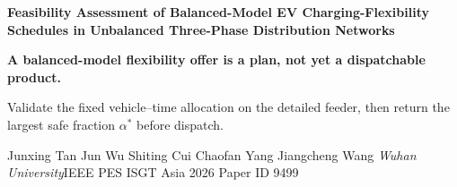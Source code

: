 \documentclass[final]{beamer}
\begin{document}
\begin{frame}[t]

\begin{tcolorbox}[enhanced,colback=posterNavy,colframe=posterNavy,boxrule=0pt,
  arc=0pt,left=0.72cm,right=0.72cm,top=0.38cm,bottom=0.38cm]
  {\color{white}\fontsize{70}{78}\selectfont\bfseries
  Feasibility Assessment of Balanced-Model EV Charging-Flexibility\\[-0.02em]
  Schedules in Unbalanced Three-Phase Distribution Networks\par}
  \vspace{0.16cm}
  {\color{posterAmber}\fontsize{37}{44}\selectfont\bfseries
  A balanced-model flexibility offer is a plan, not yet a dispatchable product.\par}
  \vspace{0.10cm}
  {\color{white}\fontsize{31}{37}\selectfont
  Validate the fixed vehicle--time allocation on the detailed feeder, then return the largest safe fraction $\alpha^*$ before dispatch.\par}
  \vspace{0.16cm}
  {\color{white}\fontsize{28}{34}\selectfont
  Junxing Tan \quad Jun Wu \quad Shiting Cui \quad Chaofan Yang \quad Jiangcheng Wang\quad
  \textit{Wuhan University}\hfill IEEE PES ISGT Asia 2026 \quad Paper ID 9499\par}
\end{tcolorbox}

\vspace{0.22cm}


\end{frame}
\end{document}
